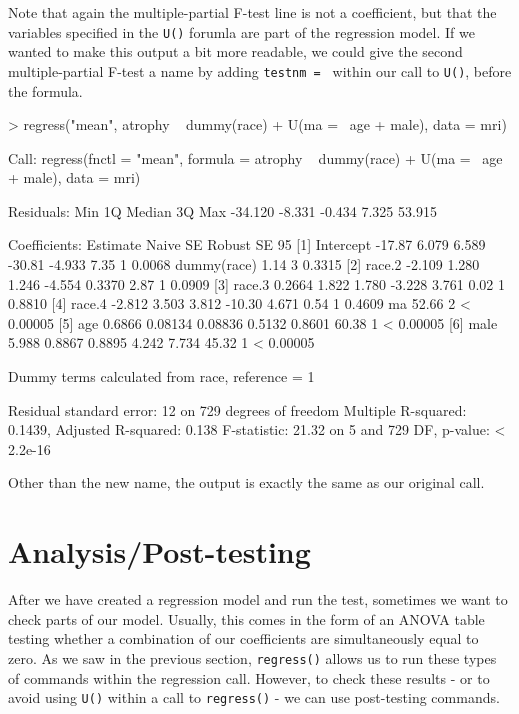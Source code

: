 \documentclass[landscape]{article}
\renewenvironment{Schunk}{\vspace{\topsep}}{\vspace{\topsep}}
\begin{document}
Note that again the multiple-partial F-test line is not a coefficient, but that the variables specified in the \texttt{U()} forumla are part of the regression model. If we wanted to make this output a bit more readable, we could give the second multiple-partial F-test a name by adding \texttt{testnm = } within our call to \texttt{U()}, before the formula.
\begin{Schunk}
\begin{Sinput}
> regress("mean", atrophy ~ dummy(race) + U(ma = ~age + male), data = mri)
\end{Sinput}
\begin{Soutput}
Call:
regress(fnctl = "mean", formula = atrophy ~ dummy(race) + U(ma = ~age + 
    male), data = mri)

Residuals:
    Min      1Q  Median      3Q     Max 
-34.120  -8.331  -0.434   7.325  53.915 

Coefficients:
                   Estimate  Naive SE  Robust SE    95%
[1] Intercept       -17.87     6.079     6.589       -30.81    -4.933           7.35 1    0.0068 
    dummy(race)                                                                 1.14 3    0.3315 
[2]    race.2       -2.109     1.280     1.246       -4.554     0.3370          2.87 1    0.0909 
[3]    race.3        0.2664    1.822     1.780       -3.228     3.761           0.02 1    0.8810 
[4]    race.4       -2.812     3.503     3.812       -10.30     4.671           0.54 1    0.4609 
    ma                                                                         52.66 2  < 0.00005
[5]   age            0.6866   0.08134   0.08836       0.5132    0.8601         60.38 1  < 0.00005
[6]   male           5.988     0.8867    0.8895       4.242     7.734          45.32 1  < 0.00005

 Dummy terms calculated from race, reference = 1 

Residual standard error: 12 on 729 degrees of freedom
Multiple R-squared:  0.1439,	Adjusted R-squared:  0.138 
F-statistic: 21.32 on 5 and 729 DF,  p-value: < 2.2e-16
\end{Soutput}
\end{Schunk}

Other than the new name, the output is exactly the same as our original call. 

\section{Analysis/Post-testing}
After we have created a regression model and run the test, sometimes we want to check parts of our model. Usually, this comes in the form of an ANOVA table testing whether a combination of our coefficients are simultaneously equal to zero. As we saw in the previous section, \texttt{regress()} allows us to run these types of commands within the regression call. However, to check these results - or to avoid using \texttt{U()} within a call to \texttt{regress()} - we can use post-testing commands. 
\end{document}
